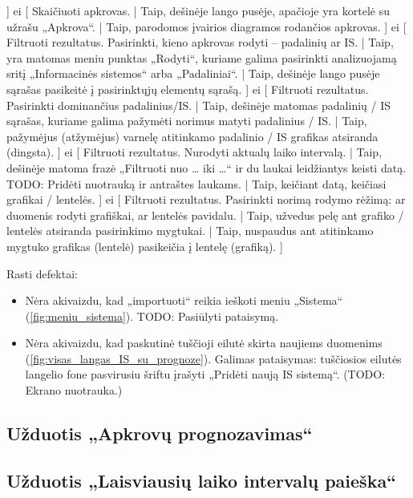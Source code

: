 {    ]
  ei [
    Skaičiuoti apkrovas. |
    Taip, dešinėje lango pusėje, apačioje yra kortelė su užrašu „Apkrova“. |
    Taip, parodomos įvairios diagramos rodančios apkrovas.
    ]
  ei [
    Filtruoti rezultatus. Pasirinkti, kieno apkrovas rodyti –
    padalinių ar IS. |
    Taip, yra matomas meniu punktas „Rodyti“, kuriame galima pasirinkti
    analizuojamą sritį „Informacinės sistemos“ arba „Padaliniai“. |
    Taip, dešinėje lango pusėje sąrašas pasikeitė į pasirinktųjų elementų
    sąrašą.
    ]
  ei [
    Filtruoti rezultatus. Pasirinkti dominančius padalinius/IS. |
    Taip, dešinėje matomas padalinių / IS sąrašas, kuriame galima pažymėti
    norimus matyti padalinius / IS. |
    Taip, pažymėjus (atžymėjus) varnelę atitinkamo padalinio / IS 
    grafikas atsiranda (dingsta).
    ]
  ei [
    Filtruoti rezultatus. Nurodyti aktualų laiko intervalą. |
    Taip, dešinėje matoma frazė „Filtruoti nuo … iki …“ ir du laukai
    leidžiantys keisti datą.
    TODO: Pridėti nuotrauką ir antraštes laukams. |
    Taip, keičiant datą, keičiasi grafikai / lentelės.
    ]
  ei [
    Filtruoti rezultatus. Pasirinkti norimą rodymo rėžimą: ar
    duomenis rodyti grafiškai, ar lentelės pavidalu. |
    Taip, užvedus pelę ant grafiko / lentelės atsiranda pasirinkimo
    mygtukai. |
    Taip, nuspaudus ant atitinkamo mygtuko grafikas (lentelė) pasikeičia
    į lentelę (grafiką).
    ]
}

Rasti defektai:
\begin{itemize}
  \item Nėra akivaizdu, kad „importuoti“ reikia ieškoti meniu „Sistema“
    (\ref{fig:meniu_sistema}). TODO: Pasiūlyti pataisymą.
  \item Nėra akivaizdu, kad paskutinė tuščioji eilutė skirta naujiems
    duomenims (\ref{fig:visas_langas_IS_su_prognoze}). Galimas pataisymas:
    tuščiosios eilutės langelio fone pasvirusiu šriftu įrašyti
    „Pridėti naują IS sistemą“. (TODO: Ekrano nuotrauka.)
\end{itemize}


\subsection{Užduotis „Apkrovų prognozavimas“}

\subsection{Užduotis „Laisviausių laiko intervalų paieška“}
